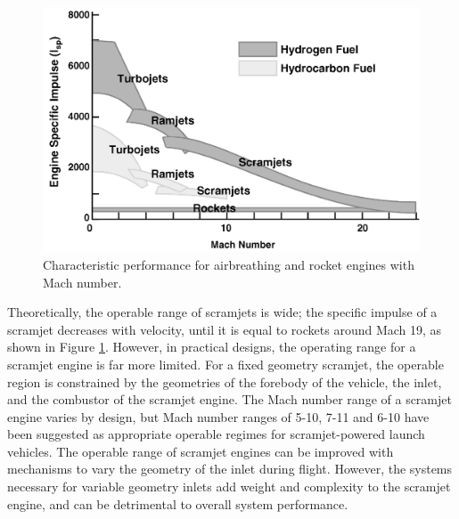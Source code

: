     \begin{figure}[ht]
    	\centering
    	\includegraphics[width=0.7\linewidth]{figures/2_literature-review/Scramjet-Efficiency}
    	\caption{Characteristic performance for airbreathing and rocket engines with Mach number\cite{Fry2004}.}
    	\label{fig:Scramjet-Efficiency}
    \end{figure}
    
    Theoretically, the operable range of scramjets is wide\cite{Smart2007a}; the specific impulse of a scramjet decreases with velocity, until it is equal to rockets around Mach 19\cite{Fry2004}, as shown in Figure \ref{fig:Scramjet-Efficiency}. 
    However, in practical designs, the operating range for a scramjet engine is far more limited. 
    For a fixed geometry scramjet, the operable region is constrained by the geometries of the forebody of the vehicle, the inlet, and the combustor of the scramjet engine\cite{Smart2010}.  
    The Mach number range of a scramjet engine varies by design, but Mach number ranges of 5-10\cite{Preller2017b}, 7-11\cite{Dalle2014} and 6-10\cite{Bradford2000} have been suggested as appropriate operable regimes for scramjet-powered launch vehicles.
    The operable range of scramjet engines can be improved with mechanisms to vary the geometry of the inlet during flight\cite{Dalle2011}. However, the systems necessary for variable geometry inlets add weight and complexity to the scramjet engine, and can be detrimental to overall system performance\cite{Smart2010}. 
    
